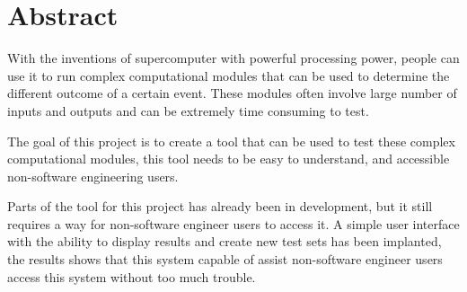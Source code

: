 \chapter*{\Large \center Abstract}

With the inventions of supercomputer with powerful processing power, people can use it to run complex computational modules that can be used to determine the different outcome of a certain event. These modules often involve large number of inputs and outputs and can be extremely time consuming to test.

The goal of this project is to create a tool that can be used to test these complex computational modules, this tool needs to be easy to understand, and accessible non-software engineering users. 

Parts of the tool for this project has already been in development, but it still requires a way for non-software engineer users to access it. A simple user interface with the ability to display results and create new test sets has been implanted, the results shows that this system capable of assist non-software engineer users access this system without too much trouble.
